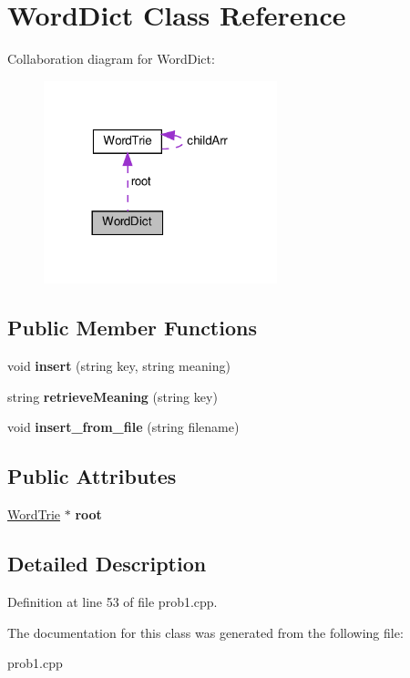 \hypertarget{classWordDict}{}\section{Word\+Dict Class Reference}
\label{classWordDict}


Collaboration diagram for Word\+Dict\+:\nopagebreak
\begin{figure}[H]
\begin{center}
\leavevmode
\includegraphics[width=192pt]{classWordDict__coll__graph}
\end{center}
\end{figure}
\subsection*{Public Member Functions}
\begin{DoxyCompactItemize}
\item 
\mbox{\label{classWordDict_a8844b0e885a3f390c85bc8439eaeb7eb}} 
void {\bfseries insert} (string key, string meaning)
\item 
\mbox{\label{classWordDict_add3fa0789f86d6c8a791005a84586042}} 
string {\bfseries retrieve\+Meaning} (string key)
\item 
\mbox{\label{classWordDict_ab5cfeac086dfc61e9928bbe2cbaacf8f}} 
void {\bfseries insert\+\_\+from\+\_\+file} (string filename)
\end{DoxyCompactItemize}
\subsection*{Public Attributes}
\begin{DoxyCompactItemize}
\item 
\mbox{\label{classWordDict_a7252f6dc8b8da32689ed39455097e816}} 
\hyperlink{classWordTrie}{Word\+Trie} $\ast$ {\bfseries root}
\end{DoxyCompactItemize}


\subsection{Detailed Description}


Definition at line 53 of file prob1.\+cpp.



The documentation for this class was generated from the following file\+:\begin{DoxyCompactItemize}
\item 
prob1.\+cpp\end{DoxyCompactItemize}
